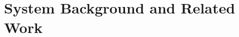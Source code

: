 \section{System Background and Related Work}
\label{sectionbackground}

{\sysname}~\cite{Levin2015Performance}

